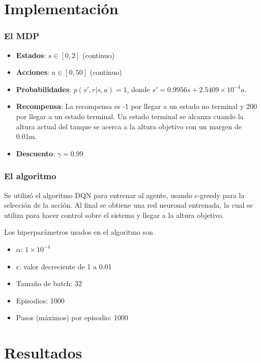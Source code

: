 \documentclass{beamer}
\begin{document}
\section{Implementación}

\begin{frame}
\frametitle{El MDP}

\begin{itemize}
\item \textbf{Estados}: $s \in [0, 2]$ (continuo)
\item \textbf{Acciones}: $a \in [0, 50]$ (continuo)
\item \textbf{Probabilidades}: $p(s', r | s, a) = 1$, donde $s' = 0.9956s + 2.5409 \times 10^{-4}a$.
\item \textbf{Recompensa}: La recompensa es -1 por llegar a un estado no terminal y 200 por llegar a un estado terminal. Un estado terminal se alcanza cuando la altura actual del tanque se acerca a la altura objetivo con un margen de 0.01m.
\item \textbf{Descuento}: $\gamma = 0.99$
\end{itemize}

\end{frame}

\begin{frame}
\frametitle{El algoritmo}

Se utilizó el algoritmo DQN para entrenar al agente, usando $\epsilon$-greedy para la selección de la acción. Al final se obtiene una red neuronal entrenada, la cual se utiliza para hacer control sobre el sistema y llegar a la altura objetivo.

Los hiperparámetros usados en el algoritmo son
\begin{itemize}
\item $\alpha$: $1 \times 10^{-4}$
\item $\epsilon$: valor decreciente de 1 a 0.01
\item Tamaño de batch: 32
\item Episodios: 1000
\item Pasos (máximos) por episodio: 1000
\end{itemize}

\end{frame}

\section{Resultados}
\end{document}

